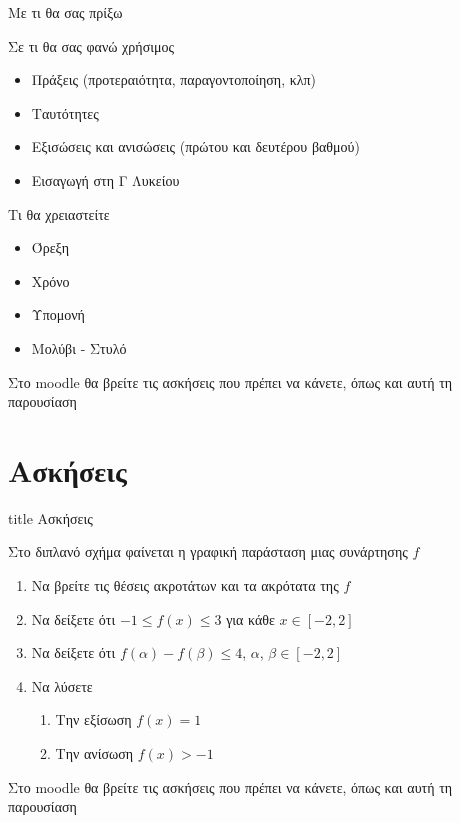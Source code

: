 \documentclass{presentation}
\begin{document}
\begin{frame}{Με τι θα σας πρίξω}
\end{frame}

\begin{frame}{Σε τι θα σας φανώ χρήσιμος}
  \begin{itemize}
    \item Πράξεις (προτεραιότητα, παραγοντοποίηση, κλπ)
    \item Ταυτότητες
    \item Εξισώσεις και ανισώσεις (πρώτου και δευτέρου βαθμού)
    \item Εισαγωγή στη Γ Λυκείου
  \end{itemize}
\end{frame}

\begin{frame}{Τι θα χρειαστείτε}
  \begin{itemize}[<+->]
    \item Όρεξη
    \item Χρόνο
    \item Υπομονή
    \item Μολύβι - Στυλό
  \end{itemize}
\end{frame}

\begin{frame}[noframenumbering]
  Στο moodle θα βρείτε τις ασκήσεις που πρέπει να κάνετε, όπως και αυτή τη παρουσίαση
\end{frame}

\section{Ασκήσεις}

\begin{frame}[noframenumbering]
  \vfill
  \centering
  \begin{beamercolorbox}[sep=8pt,center,shadow=true,rounded=true]{title}
    Ασκήσεις
  \end{beamercolorbox}
  \vfill
\end{frame}

\begin{askisi}
  Στο διπλανό σχήμα φαίνεται η γραφική παράσταση μιας συνάρτησης $f$
  \begin{enumerate}
    \item Να βρείτε τις θέσεις ακροτάτων και τα ακρότατα της $f$\pause
    \item Να δείξετε ότι $-1\le f(x) \le 3$ για κάθε $x\in[-2,2]$\pause
    \item Να δείξετε ότι $f(α)-f(β)\le 4$, $α$, $β\in[-2,2]$ \pause
    \item Να λύσετε
          \begin{enumerate}
            \item Την εξίσωση $f(x)=1$ \pause
            \item Την ανίσωση $f(x)>-1$
          \end{enumerate}
  \end{enumerate}

\end{askisi}

\begin{frame}
  Στο moodle θα βρείτε τις ασκήσεις που πρέπει να κάνετε, όπως και αυτή τη παρουσίαση
\end{frame}
\end{document}
